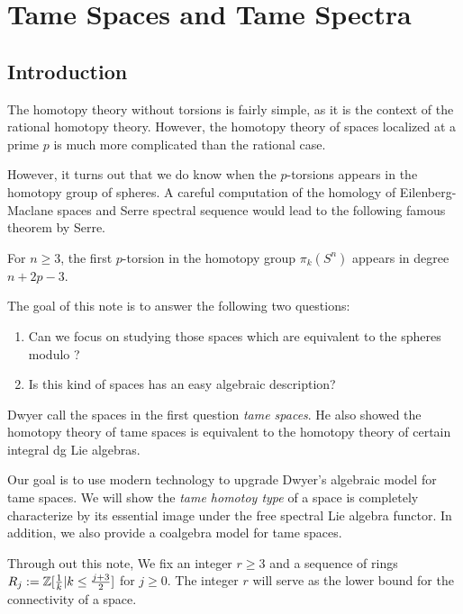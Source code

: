 \chapter{Tame Spaces and Tame Spectra}

\section{Introduction}
The homotopy theory without torsions is fairly simple, as it is the context of the rational homotopy theory.
However, the homotopy theory of spaces localized at a prime $p$ is much more complicated than the rational case. 

However, it turns out that we do know when the $p$-torsions appears in the homotopy group of spheres. A careful computation of the homology of Eilenberg-Maclane spaces and Serre spectral sequence would lead to the following famous theorem by Serre.
\begin{theorem}[Serre]
	For $n\geq 3$, the first $p$-torsion in the homotopy group $\pi_{k}(S^{n})$ appears in degree $ n+2p-3$.
\end{theorem}

The goal of this note is to answer the following two questions:
\begin{enumerate}
	\item Can we focus on studying those spaces which are equivalent to the spheres modulo ?
    \item Is this kind of spaces has an easy algebraic description?
\end{enumerate}

Dwyer \cite{Dwyer} call the spaces in the first question \emph{tame spaces}.
He also showed the homotopy theory of tame spaces is equivalent to the homotopy theory of certain integral dg Lie algebras.

Our goal is to use modern technology to upgrade Dwyer's algebraic model for tame spaces.
We will show the \emph{tame homotoy type} of a space is completely characterize by its essential image under the free spectral Lie algebra functor. 
 In addition, we also provide a coalgebra model for tame spaces.



Through out this note, We fix an integer $r\geq 3$ and a sequence of rings $R_{j}:={\mathbb{Z}}[\frac{1}{k}|k\leq \frac{j+3}{2}]$ for $j\geq 0$. The integer $r$ will serve as the lower bound for the connectivity of a space. 

